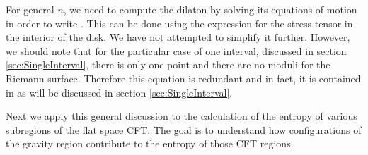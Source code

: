   For general $n$, we need to compute the dilaton by solving its equations of motion 
   in order to write  . This can be done using the expression for the stress tensor in the interior of the disk.   
    We have not attempted to simplify it further. However, we should note that for the particular case of one interval, discussed in section \ref{sec:SingleInterval}, there is only one point and there are no moduli for the Riemann surface. Therefore this equation is redundant and in fact, it is contained in  as will be discussed in section \ref{sec:SingleInterval}. 
  
 Next we apply this general discussion to the calculation of the entropy of various subregions of the flat space CFT. The goal is to understand how configurations of the gravity region contribute to the entropy of those CFT regions.
